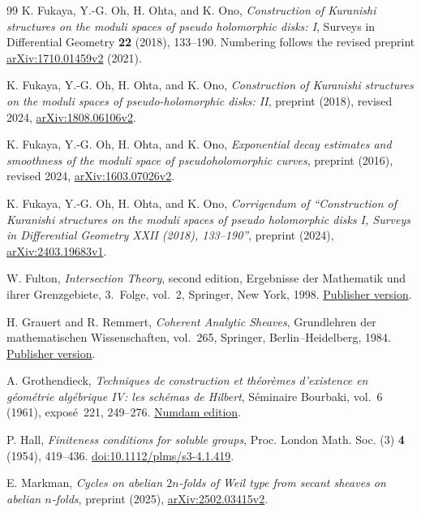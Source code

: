 \begin{thebibliography}{99}
K. Fukaya, Y.-G. Oh, H. Ohta, and K. Ono,
\emph{Construction of Kuranishi structures on the moduli spaces of
pseudo holomorphic disks: I},
Surveys in Differential Geometry \textbf{22} (2018), 133--190.
Numbering follows the revised preprint
\href{https://arxiv.org/abs/1710.01459v2}{arXiv:1710.01459v2} (2021).

K. Fukaya, Y.-G. Oh, H. Ohta, and K. Ono,
\emph{Construction of Kuranishi structures on the moduli spaces of
pseudo-holomorphic disks: II},
preprint (2018), revised 2024,
\href{https://arxiv.org/abs/1808.06106v2}{arXiv:1808.06106v2}.

K. Fukaya, Y.-G. Oh, H. Ohta, and K. Ono,
\emph{Exponential decay estimates and smoothness of the moduli space
of pseudoholomorphic curves},
preprint (2016), revised 2024,
\href{https://arxiv.org/abs/1603.07026v2}{arXiv:1603.07026v2}.

K. Fukaya, Y.-G. Oh, H. Ohta, and K. Ono,
\emph{Corrigendum of ``Construction of Kuranishi structures on the
moduli spaces of pseudo holomorphic disks I, Surveys in Differential
Geometry XXII (2018), 133--190''},
preprint (2024), \href{https://arxiv.org/abs/2403.19683v1}{arXiv:2403.19683v1}.

W. Fulton,
\emph{Intersection Theory}, second edition,
Ergebnisse der Mathematik und ihrer Grenzgebiete, 3.~Folge, vol.~2,
Springer, New York, 1998.
\href{https://doi.org/10.1007/978-1-4612-1700-8}{Publisher version}.

H. Grauert and R. Remmert,
\emph{Coherent Analytic Sheaves},
Grundlehren der mathematischen Wissenschaften, vol.~265,
Springer, Berlin--Heidelberg, 1984.
\href{https://doi.org/10.1007/978-3-642-69582-7}{Publisher version}.

A. Grothendieck,
\emph{Techniques de construction et th\'eor\`emes d'existence en
g\'eom\'etrie alg\'ebrique IV: les sch\'emas de Hilbert},
S\'eminaire Bourbaki, vol.~6 (1961), expos\'e~221, 249--276.
\href{https://numdam.org/item/SB_1960-1961__6__249_0/}{Numdam edition}.

P. Hall,
\emph{Finiteness conditions for soluble groups},
Proc. London Math. Soc. (3) \textbf{4} (1954), 419--436.
\href{https://doi.org/10.1112/plms/s3-4.1.419}{doi:10.1112/plms/s3-4.1.419}.

E. Markman,
\emph{Cycles on abelian $2n$-folds of Weil type from secant sheaves
on abelian $n$-folds},
preprint (2025), \href{https://arxiv.org/abs/2502.03415v2}{arXiv:2502.03415v2}.


\end{thebibliography}
